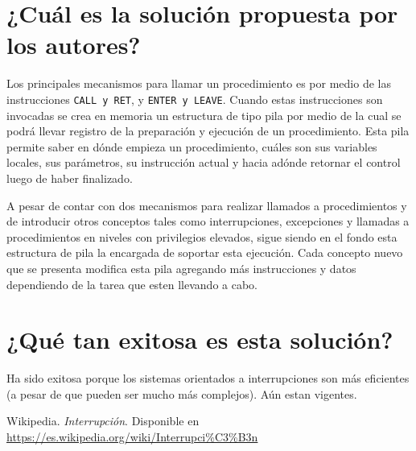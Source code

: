 \section{¿Cuál es la solución propuesta por los autores?}
Los principales mecanismos para llamar un procedimiento es por medio de las instrucciones \texttt{CALL \textnormal{y} RET}, y \texttt{ENTER \textnormal{y} LEAVE}. Cuando estas instrucciones son invocadas se crea en memoria un estructura de tipo pila por medio de la cual se podrá llevar registro de la preparación y ejecución de un procedimiento. Esta pila permite saber en dónde empieza un procedimiento, cuáles son sus variables locales, sus parámetros, su instrucción actual y hacia adónde retornar el control luego de haber finalizado.

A pesar de contar con dos mecanismos para realizar llamados a procedimientos y de introducir otros conceptos tales como interrupciones, excepciones y llamadas a procedimientos en niveles con privilegios elevados, sigue siendo en el fondo esta estructura de pila la encargada de soportar esta ejecución. Cada concepto nuevo que se presenta modifica esta pila agregando más instrucciones y datos dependiendo de la tarea que esten llevando a cabo.

\section{¿Qué tan exitosa es esta solución?} 
Ha sido exitosa porque los sistemas orientados a interrupciones son más eficientes (a pesar de que pueden ser mucho más complejos). Aún estan vigentes.




\begin{thebibliography}{9}

 Wikipedia. \textit{Interrupción}. Disponible en \url{https://es.wikipedia.org/wiki/Interrupci%C3%B3n}

\end{thebibliography}






















